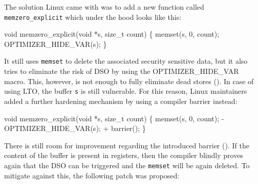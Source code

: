 \documentclass[
  a4paper,
]{report}
\newenvironment{Shaded}{}{}
\newcommand{\DataTypeTok}[1]{\textcolor[rgb]{0.56,0.13,0.00}{#1}}
\newcommand{\DecValTok}[1]{\textcolor[rgb]{0.25,0.63,0.44}{#1}}
\newcommand{\NormalTok}[1]{#1}
\newcommand{\OperatorTok}[1]{\textcolor[rgb]{0.40,0.40,0.40}{#1}}
\begin{document}
The solution Linux came with was to add a new function called
\texttt{memzero\_explicit} which under the hood looks like this:

\begin{Shaded}
\begin{Highlighting}[]
\DataTypeTok{void}\NormalTok{ memzero\_explicit}\OperatorTok{(}\DataTypeTok{void} \OperatorTok{*}\NormalTok{s}\OperatorTok{,} \DataTypeTok{size\_t}\NormalTok{ count}\OperatorTok{)}
\OperatorTok{\{}
\NormalTok{  memset}\OperatorTok{(}\NormalTok{s}\OperatorTok{,} \DecValTok{0}\OperatorTok{,}\NormalTok{ count}\OperatorTok{);}
\NormalTok{  OPTIMIZER\_HIDE\_VAR}\OperatorTok{(}\NormalTok{s}\OperatorTok{);}
\OperatorTok{\}}
\end{Highlighting}
\end{Shaded}

It still uses
\label{__index_entry_184}{\texttt{memset}}
to delete the associated security sensitive data, but it also tries to
eliminate the risk of DSO by using the OPTIMIZER\_HIDE\_VAR macro. This,
however, is not enough to fully eliminate dead stores
(). In case of using LTO, the
buffer \texttt{s} is still vulnerable. For this reason, Linux
maintainers added a further hardening mechanism by using a compiler
barrier instead:

\begin{Shaded}
\begin{Highlighting}[]
\DataTypeTok{void}\NormalTok{ memzero\_explicit}\OperatorTok{(}\DataTypeTok{void} \OperatorTok{*}\NormalTok{s}\OperatorTok{,} \DataTypeTok{size\_t}\NormalTok{ count}\OperatorTok{)}
\OperatorTok{\{}
\NormalTok{  memset}\OperatorTok{(}\NormalTok{s}\OperatorTok{,} \DecValTok{0}\OperatorTok{,}\NormalTok{ count}\OperatorTok{);}
  \OperatorTok{{-}}\NormalTok{ OPTIMIZER\_HIDE\_VAR}\OperatorTok{(}\NormalTok{s}\OperatorTok{);}
  \OperatorTok{+}\NormalTok{ barrier}\OperatorTok{();}
\OperatorTok{\}}
\end{Highlighting}
\end{Shaded}

There is still room for improvement regarding the introduced barrier
(). If the content of the
buffer is present in registers, then the compiler blindly proves again
that the DSO can be triggered and the \texttt{memset} will be again
deleted. To mitigate against this, the following patch was proposed:
\end{document}
